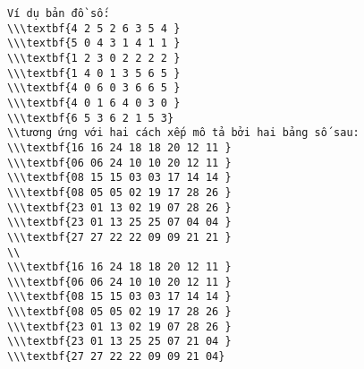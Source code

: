 \begin{verbatim}
Ví dụ bản đồ số:
\\\textbf{4 2 5 2 6 3 5 4 }
\\\textbf{5 0 4 3 1 4 1 1 }
\\\textbf{1 2 3 0 2 2 2 2 }
\\\textbf{1 4 0 1 3 5 6 5 }
\\\textbf{4 0 6 0 3 6 6 5 }
\\\textbf{4 0 1 6 4 0 3 0 }
\\\textbf{6 5 3 6 2 1 5 3} 
\\tương ứng với hai cách xếp mô tả bởi hai bảng số sau:
\\\textbf{16 16 24 18 18 20 12 11 }
\\\textbf{06 06 24 10 10 20 12 11 }
\\\textbf{08 15 15 03 03 17 14 14 }
\\\textbf{08 05 05 02 19 17 28 26 }
\\\textbf{23 01 13 02 19 07 28 26 }
\\\textbf{23 01 13 25 25 07 04 04 }
\\\textbf{27 27 22 22 09 09 21 21 }
\\
\\\textbf{16 16 24 18 18 20 12 11 }
\\\textbf{06 06 24 10 10 20 12 11 }
\\\textbf{08 15 15 03 03 17 14 14 }
\\\textbf{08 05 05 02 19 17 28 26 }
\\\textbf{23 01 13 02 19 07 28 26 }
\\\textbf{23 01 13 25 25 07 21 04 }
\\\textbf{27 27 22 22 09 09 21 04}\end{verbatim}